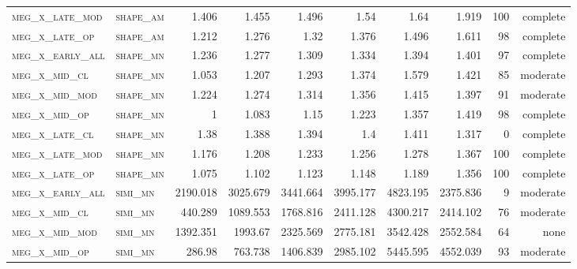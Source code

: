 \begin{landscape}
\begin{center}
\begin{footnotesize}
\begin{longtable}{llrrrrr|rrr}
\textsc{meg\_x\_late\_mod } & \textsc{shape\_am }    & 1.406    & 1.455    & 1.496    & 1.54     & 1.64      & 1.919         & 100           & complete             \\
\textsc{meg\_x\_late\_op  } & \textsc{shape\_am }    & 1.212    & 1.276    & 1.32     & 1.376    & 1.496     & 1.611         & 98            & complete              \\
\textsc{meg\_x\_early\_all} & \textsc{shape\_mn }    & 1.236    & 1.277    & 1.309    & 1.334    & 1.394     & 1.401         & 97            & complete              \\
\textsc{meg\_x\_mid\_cl   } & \textsc{shape\_mn }    & 1.053    & 1.207    & 1.293    & 1.374    & 1.579     & 1.421         & 85            & moderate              \\
\textsc{meg\_x\_mid\_mod  } & \textsc{shape\_mn }    & 1.224    & 1.274    & 1.314    & 1.356    & 1.415     & 1.397         & 91            & moderate              \\
\textsc{meg\_x\_mid\_op   } & \textsc{shape\_mn }    & 1        & 1.083    & 1.15     & 1.223    & 1.357     & 1.419         & 98            & complete              \\
\textsc{meg\_x\_late\_cl  } & \textsc{shape\_mn }    & 1.38     & 1.388    & 1.394    & 1.4      & 1.411     & 1.317         & 0             & complete            \\
\textsc{meg\_x\_late\_mod } & \textsc{shape\_mn }    & 1.176    & 1.208    & 1.233    & 1.256    & 1.278     & 1.367         & 100           & complete             \\
\textsc{meg\_x\_late\_op  } & \textsc{shape\_mn }    & 1.075    & 1.102    & 1.123    & 1.148    & 1.189     & 1.356         & 100           & complete             \\
\textsc{meg\_x\_early\_all} & \textsc{simi\_mn  }    & 2190.018 & 3025.679 & 3441.664 & 3995.177 & 4823.195  & 2375.836      & 9             & moderate             \\
\textsc{meg\_x\_mid\_cl   } & \textsc{simi\_mn  }    & 440.289  & 1089.553 & 1768.816 & 2411.128 & 4300.217  & 2414.102      & 76            & moderate              \\
\textsc{meg\_x\_mid\_mod  } & \textsc{simi\_mn  }    & 1392.351 & 1993.67  & 2325.569 & 2775.181 & 3542.428  & 2552.584      & 64            & none              \\
\textsc{meg\_x\_mid\_op   } & \textsc{simi\_mn  }    & 286.98   & 763.738  & 1406.839 & 2985.102 & 5445.595  & 4552.039      & 93            & moderate              \\

\end{longtable}
\end{footnotesize}
\end{center}
\end{landscape}
